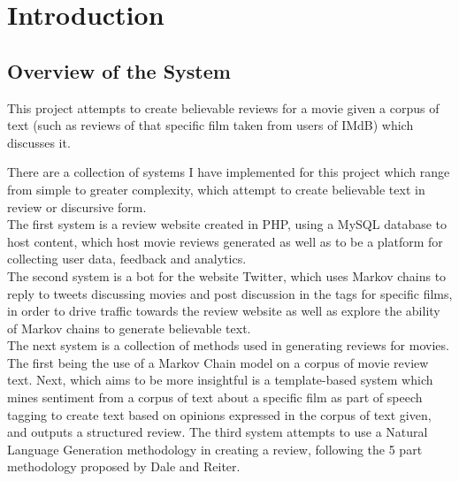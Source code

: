 %

\chapter{\label{ch:1-intro}Introduction} 

\minitoc

\section{Overview of the System}
This project attempts to create believable reviews for a movie given a corpus of text (such as reviews of that specific film taken from users of IMdB) which discusses it. 

There are a collection of systems I have implemented for this project which range from simple to greater complexity, which attempt to create believable text in review or discursive form. \\

The first system is a review website created in PHP, using a MySQL database to host content, which host movie reviews generated as well as to be a platform for collecting user data, feedback and analytics.\\

The second system is a bot for the website Twitter, which uses Markov chains to reply to tweets discussing movies and post discussion in the tags for specific films, in order to drive traffic towards the review website as well as explore the ability of Markov chains to generate believable text.\\

The next system is a collection of methods used in generating reviews for movies. The first being the use of a Markov Chain model on a corpus of movie review text. Next, which aims to be more insightful is a template-based system which mines sentiment from a corpus of text about a specific film as part of speech tagging to create text based on opinions expressed in the corpus of text given, and outputs a structured review. The third system attempts to use a Natural Language Generation methodology in creating a review, following the 5 part methodology proposed by Dale and Reiter.

